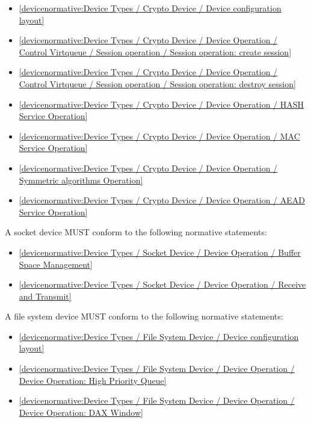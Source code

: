\begin{itemize}
\item \ref{devicenormative:Device Types / Crypto Device / Device configuration layout}
\item \ref{devicenormative:Device Types / Crypto Device / Device Operation / Control Virtqueue / Session operation / Session operation: create session}
\item \ref{devicenormative:Device Types / Crypto Device / Device Operation / Control Virtqueue / Session operation / Session operation: destroy session}
\item \ref{devicenormative:Device Types / Crypto Device / Device Operation / HASH Service Operation}
\item \ref{devicenormative:Device Types / Crypto Device / Device Operation / MAC Service Operation}
\item \ref{devicenormative:Device Types / Crypto Device / Device Operation / Symmetric algorithms Operation}
\item \ref{devicenormative:Device Types / Crypto Device / Device Operation / AEAD Service Operation}
\end{itemize}

\label{sec:Conformance / Device Conformance / Socket Device Conformance}

A socket device MUST conform to the following normative statements:

\begin{itemize}
\item \ref{devicenormative:Device Types / Socket Device / Device Operation / Buffer Space Management}
\item \ref{devicenormative:Device Types / Socket Device / Device Operation / Receive and Transmit}
\end{itemize}

\label{sec:Conformance / Device Conformance / File System Device Conformance}

A file system device MUST conform to the following normative statements:

\begin{itemize}
\item \ref{devicenormative:Device Types / File System Device / Device configuration layout}
\item \ref{devicenormative:Device Types / File System Device / Device Operation / Device Operation: High Priority Queue}
\item \ref{devicenormative:Device Types / File System Device / Device Operation / Device Operation: DAX Window}
\end{itemize}

